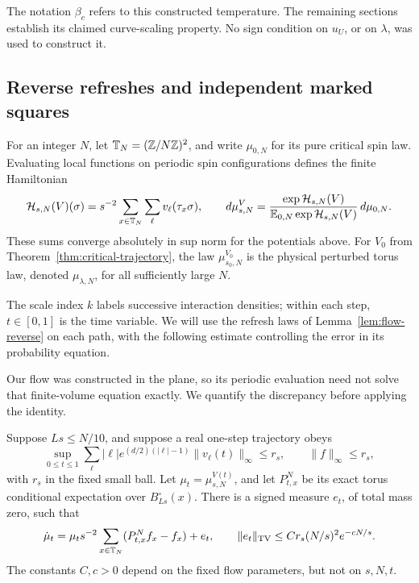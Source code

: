 The notation \(\beta_c\) refers to this constructed temperature.  The
remaining sections establish its claimed curve-scaling property.  No
sign condition on \(u_U\), or on \(\lambda\), was used to construct it.

\subsection{Reverse refreshes and independent marked squares}

For an integer \(N\), let \(\mathbb T_N=(\mathbb Z/N\mathbb Z)^2\), and write
\(\mu_{0,N}\) for its pure critical spin law.  Evaluating local functions
on periodic spin configurations defines the finite Hamiltonian
\[
 \mathcal H_{s,N}(V)(\sigma)
 =s^{-2}\sum_{x\in\mathbb T_N}\sum_\ell v_\ell(\tau_x\sigma),
 \qquad
 d\mu_{s,N}^{V}=\frac{\exp\mathcal H_{s,N}(V)}
 {\mathbb E_{0,N}\exp\mathcal H_{s,N}(V)}\,d\mu_{0,N}.
\]
These sums converge absolutely in sup norm for the potentials above.
For \(V_0\) from Theorem~\ref{thm:critical-trajectory}, the law
\(\mu_{s_0,N}^{V_0}\) is the physical perturbed torus law, denoted
\(\mu_{\lambda,N}\), for all sufficiently large \(N\).

The scale index $k$ labels successive interaction densities; within each
step, $t\in[0,1]$ is the time variable.  We will use the refresh laws of
Lemma~\ref{lem:flow-reverse} on each path, with the following estimate
controlling the error in its probability equation.

Our flow was constructed in the plane, so its periodic evaluation need
not solve that finite-volume equation exactly.  We quantify the discrepancy
before applying the identity.

\begin{lemma}\label{lem:flow-periodization}
Suppose \(Ls\le N/10\), and suppose a real one-step trajectory obeys
\[
 \sup_{0\le t\le1}\sum_\ell |\ell|
 e^{(d/2)(|\ell|-1)}\|v_\ell(t)\|_\infty\le r_s,
 \qquad \|f\|_\infty\le r_s,
\]
with \(r_s\) in the fixed small ball.  Let \(\mu_t=\mu_{s,N}^{V(t)}\),
and let \(P_{t,x}^{N}\) be its exact torus conditional expectation over
\(B_{Ls}^\circ(x)\).  There is a signed measure \(e_t\), of total mass
zero, such that
\begin{equation}\label{eq:flow-finite-residual}
 \dot\mu_t=\mu_t s^{-2}\sum_{x\in\mathbb T_N}
       (P_{t,x}^{N}f_x-f_x)+e_t,
 \qquad
 \|e_t\|_{\operatorname{TV}}\le C r_s(N/s)^2e^{-cN/s}.
\end{equation}
The constants \(C,c>0\) depend on the fixed flow parameters, but not on
\(s,N,t\).
\end{lemma}

